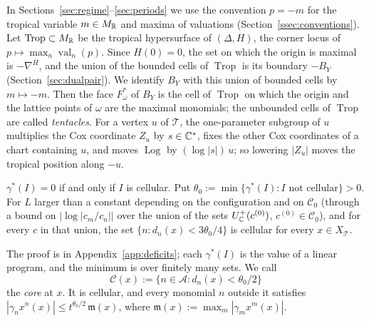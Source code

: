 In Sections~\ref{sec:regime}--\ref{sec:periods} we use the convention $p=-m$ for the tropical variable $m\in M_\mathbb R$ and maxima of valuations (Section~\ref{ssec:conventions}).
Let $\operatorname{Trop}\subset M_\mathbb R$ be the tropical hypersurface of $(\Delta,H)$, the corner locus of
$p\mapsto\max_n\operatorname{val}_n(p)$. Since $H(0)=0$, the set on which the origin is maximal is $-\nabla^H$, and the
union of the bounded cells of $\operatorname{Trop}$ is its boundary $-B_Y$ (Section~\ref{sec:dualpair}). We identify
$B_Y$ with this union of bounded cells by $m\mapsto-m$. Then the face $F^*_\omega$ of $B_Y$ is the cell of
$\operatorname{Trop}$ on which the origin and the lattice points of $\omega$ are the maximal monomials; the unbounded cells
of $\operatorname{Trop}$ are called \emph{tentacles}. For a vertex $u$ of $\mathcal T$, the one-parameter subgroup of $u$
multiplies the Cox coordinate $Z_u$ by $s\in\mathbb C^*$, fixes the other Cox coordinates of a chart containing $u$, and moves
$\operatorname{Log}$ by $(\log|s|)\,u$; so lowering $|Z_u|$ moves the tropical position along $-u$.

\begin{lemma}\label{lem:onecell}
$\gamma^*(I)=0$ if and only if $I$ is cellular. Put $\theta_0:=\min\{\gamma^*(I):I\text{ not cellular}\}>0$. For $L$
larger than a constant depending on the configuration and on $\mathscr C_0$ (through a bound on $|\log|c_m/c_n||$ over the
union of the sets $U^+_\mathbb C(c^{(0)})$, $c^{(0)}\in\mathscr C_0$), and for every $c$ in that union, the set
$\{n:d_n(x)<3\theta_0/4\}$ is cellular for every $x\in X_{\mathcal T}$.
\end{lemma}

The proof is in Appendix~\ref{app:deficits}; each $\gamma^*(I)$ is the value of a linear program, and the minimum is over
finitely many sets. We call
\[
\mathcal C(x):=\{n\in\mathcal A:d_n(x)<\theta_0/2\}
\]
the \emph{core} at $x$. It is cellular, and every monomial $n$ outside it satisfies
$|\gamma_nx^n(x)|\le t^{\theta_0/2}\,\mathfrak m(x)$, where $\mathfrak m(x):=\max_m|\gamma_mx^m(x)|$.

